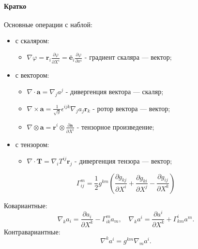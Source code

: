
\paragraph{Кратко}
Основные операции с наблой:

\begin{itemize}
	\item с скаляром:
	\begin{itemize}
		\item $\nabla \varphi=\mathbf{r}_i\frac{\partial\varphi}{\partial X^i}=\bar{\mathbf{e}}_i\frac{\partial \varphi}{\partial x^i}$ - градиент скаляра --- вектор;
	\end{itemize}
	\item с вектором:
	\begin{itemize}
		\item $\nabla\cdot\mathbf{a}=\nabla_ja^j$ - дивергенция вектора --- скаляр;
		\item $\nabla\times\mathbf{a}=\frac{1}{\sqrt{g}}\epsilon^{ijk}\nabla_ja_j\mathbf{r}_k$ - ротор вектора --- вектор;
		\item $\nabla\otimes\mathbf{a}=\mathbf{r}^i \otimes \frac{\partial \mathbf{a}}{\partial X^i} $ - тензорное произведение;
	\end{itemize}
	\item с тензором:
	\begin{itemize}
		\item $\nabla\cdot\mathbf{T}=\nabla_iT^{ij}\mathbf{r}_j$ - дивергенция тензора --- вектор;
	\end{itemize}
\end{itemize}

\begin{definition}[Кристоффель]
	\begin{equation*}
		\Gamma^{m}_{ij}=\frac{1}{2}g^{km}\left(
		\frac{\partial g_{kj}}{\partial X^i} + \frac{\partial g_{ki}}{\partial X^j} -
		\frac{\partial g_{ij}}{\partial X^k}
		\right)
	\end{equation*}
\end{definition}

\begin{definition}[Производные]
	
	Ковариантные:
	\begin{equation*}
		\nabla_ka_i=\frac{\partial a_i}{\partial X^k} - \Gamma^m_{ik}a_m,\quad
		\nabla_ka^i=\frac{\partial a^i}{\partial X^k} + \Gamma^i_{km}a^m.
	\end{equation*}
	Контравариантные:
	\begin{equation*}
		\nabla^ka^i=g^{km}\nabla_ma^i.
	\end{equation*}
\end{definition}


